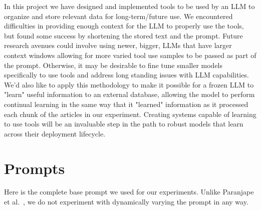 \documentclass{article}
\begin{document}
In this project we have designed and implemented tools to be used by an LLM to organize and store relevant data for long-term/future use.
We encountered difficulties in providing enough context for the LLM to properly use the tools, but found some success by shortening the stored text and the prompt.
Future research avenues could involve using newer, bigger, LLMs that have larger context windows allowing for more varied tool use samples to be passed as part of the prompt.
Otherwise, it may be desirable to fine tune smaller models specifically to use tools and address long standing issues with LLM capabilities.
We'd also like to apply this methodology to make it possible for a frozen LLM to "learn" useful information to an external database, allowing the model to perform continual learning in the same way that it "learned" information as it processed each chunk of the articles in our experiment.
Creating systems capable of learning to use tools will be an invaluable step in the path to robust models that learn across their deployment lifecycle.





\appendix

\section{Prompts}\label{section:prompts}

Here is the complete base prompt we used for our experiments. Unlike Paranjape et al.~\cite{paranjape2023art}, we do not experiment with dynamically varying the prompt in any way.
\end{document}
